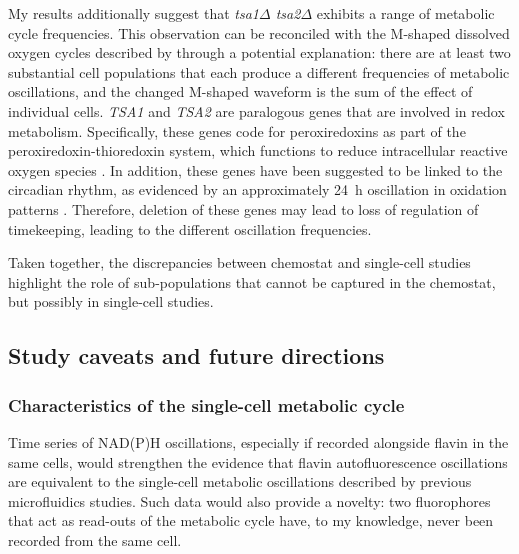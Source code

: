 My results additionally suggest that \textit{tsa1$\Delta$ tsa2$\Delta$} exhibits a range of metabolic cycle frequencies.
This observation can be reconciled with the M-shaped dissolved oxygen cycles described by \textcite{caustonMetabolicCyclesYeast2015} through a potential explanation: there are at least two substantial cell populations that each produce a different frequencies of metabolic oscillations, and the changed M-shaped waveform is the sum of the effect of individual cells.
\textit{TSA1} and \textit{TSA2} are paralogous genes that are involved in redox metabolism.
Specifically, these genes code for peroxiredoxins as part of the peroxiredoxin-thioredoxin system, which functions to reduce intracellular reactive oxygen species \parencite{wongCooperationYeastPeroxiredoxins2002}.
In addition, these genes have been suggested to be linked to the circadian rhythm, as evidenced by an approximately \SI{24}{\hour} oscillation in oxidation patterns \parencite{edgarPeroxiredoxinsAreConserved2012}.
Therefore, deletion of these genes may lead to loss of regulation of timekeeping, leading to the different oscillation frequencies.

Taken together, the discrepancies between chemostat and single-cell studies highlight the role of sub-populations that cannot be captured in the chemostat, but possibly in single-cell studies.


\subsection{Study caveats and future directions}
\label{subsec:biology-discussion-caveats}


\subsubsection{Characteristics of the single-cell metabolic cycle}
\label{subsec:biology-discussion-caveats-characteristics}

Time series of NAD(P)H oscillations, especially if recorded alongside flavin in the same cells, would strengthen the evidence that flavin autofluorescence oscillations are equivalent to the single-cell metabolic oscillations described by previous microfluidics studies.
Such data would also provide a novelty: two fluorophores that act as read-outs of the metabolic cycle have, to my knowledge, never been recorded from the same cell.


